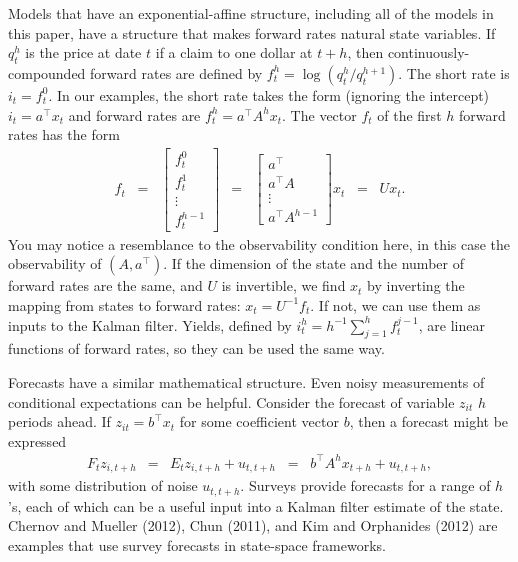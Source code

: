 \documentclass[11pt]{article}
\begin{document}
{Models that have an exponential-affine structure,
including all of the models in this paper,
have a structure that makes forward rates natural state variables.
If $q_t^h$ is the price at date $t$ if a claim to one dollar at $t+h$,
then continuously-compounded forward rates are defined by
$ f^h_t = \log (q^h_t/q^{h+1}_t)$.
The short rate is $i_t = f^0_t$.
In  our examples, the short rate takes the form (ignoring the intercept) $i_t = a^\top x_t$
and forward rates are $f^h_t = a^{\top} A^h x_t$.
The vector $f_t$ of the first $h$ forward rates has the form
\begin{eqnarray*}
    f_t  \;\;=\;\; \left[  \begin{array}{c} f^0_t \\ f^1_t \\ \vdots \\ f^{h-1}_t \end{array} \right]
        &=&
    \left[  \begin{array}{c} a^\top \\ a^\top A \\ \vdots \\ a^\top A^{h-1} \end{array} \right]
     x_t
    \;\;=\;\; U x_t .
\end{eqnarray*}
You may notice a resemblance to the observability condition here,
in this case the observability of $(A, a^\top)$.
If the dimension of the state and the number of forward rates are the same,
and $U$ is invertible,
we find $x_t$ by inverting the mapping from states to forward rates:  $x_t = U^{-1} f_t$.
If not, we can use them as inputs to the Kalman filter.
Yields, defined by $ i^h_t = h^{-1} \sum_{j=1}^h f^{j-1}_t $,
are linear functions of forward rates, so they can be used the same way.

Forecasts have a similar mathematical structure.
Even noisy measurements of conditional expectations can be helpful.
Consider the forecast of variable $z_{it}$ $h$ periods ahead.
If $ z_{it} = b^\top x_t$ for some coefficient vector $b$,
then a forecast might be expressed
\begin{eqnarray*}
    F_t z_{i,t+h}&=& E_t z_{i,t+h} + u_{t,t+h}
            \;\;=\;\; b^\top A^h x_{t+h} + u_{t,t+h},
\end{eqnarray*}
with some distribution of noise $u_{t,t+h}$.
Surveys provide forecasts for a range of $h$'s,
each of which can be a useful input into a Kalman filter estimate of the state.
Chernov and Mueller (2012), Chun (2011), and Kim and Orphanides (2012)
are examples that use survey forecasts in state-space frameworks.

}
\end{document}

